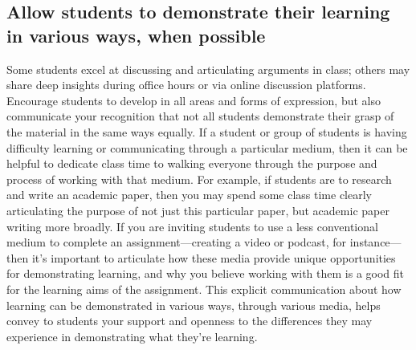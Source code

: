 \subsection{Allow students to demonstrate their learning in various ways, when possible}
\label{sec:allow-stud-demonstr}

Some students excel at discussing and articulating arguments in class; others may share deep insights during office hours or via online discussion platforms. Encourage students to develop in all areas and forms of expression, but also communicate your recognition that not all students demonstrate their grasp of the material in the same ways equally. If a student or group of students is having difficulty learning or communicating through a particular medium, then it can be helpful to dedicate class time to walking everyone through the purpose and process of working with that medium. For example, if students are to research and write an academic paper, then you may spend some class time clearly articulating the purpose of not just this particular paper, but academic paper writing more broadly. If you are inviting students to use a less conventional medium to complete an assignment—creating a video or podcast, for instance—then it’s important to articulate how these media provide unique opportunities for demonstrating learning, and why you believe working with them is a good fit for the learning aims of the assignment. This explicit communication about how learning can be demonstrated in various ways, through various media, helps convey to students your support and openness to the differences they may experience in demonstrating what they’re learning.


